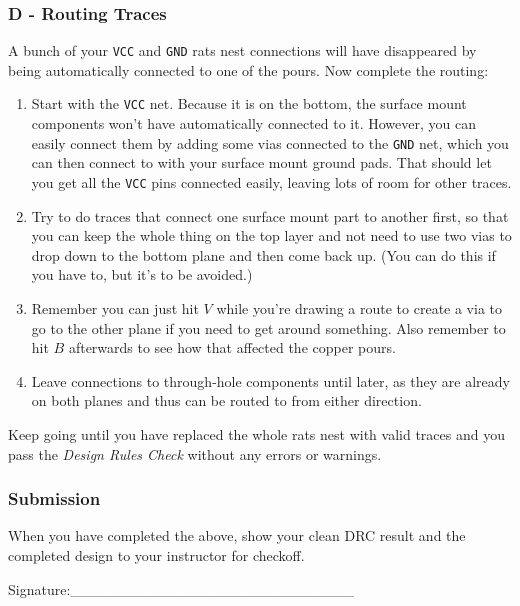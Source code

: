 \documentclass[
  letterpaper,
  DIV=11,
  numbers=noendperiod,
  oneside]{scrartcl}
\providecommand{\tightlist}{%
  \setlength{\itemsep}{0pt}\setlength{\parskip}{0pt}}\usepackage{longtable,booktabs,array}
\begin{document}
\subsubsection{D - Routing Traces}\label{d---routing-traces}

A bunch of your \texttt{VCC} and \texttt{GND} rats nest connections will
have disappeared by being automatically connected to one of the pours.
Now complete the routing:

\begin{enumerate}
\def\labelenumi{\arabic{enumi}.}
\tightlist
\item
  Start with the \texttt{VCC} net. Because it is on the bottom, the
  surface mount components won't have automatically connected to it.
  However, you can easily connect them by adding some vias connected to
  the \texttt{GND} net, which you can then connect to with your surface
  mount ground pads. That should let you get all the \texttt{VCC} pins
  connected easily, leaving lots of room for other traces.
\item
  Try to do traces that connect one surface mount part to another first,
  so that you can keep the whole thing on the top layer and not need to
  use two vias to drop down to the bottom plane and then come back up.
  (You can do this if you have to, but it's to be avoided.)
\item
  Remember you can just hit \(V\) while you're drawing a route to create
  a via to go to the other plane if you need to get around something.
  Also remember to hit \(B\) afterwards to see how that affected the
  copper pours.
\item
  Leave connections to through-hole components until later, as they are
  already on both planes and thus can be routed to from either
  direction.
\end{enumerate}

Keep going until you have replaced the whole rats nest with valid traces
and you pass the \emph{Design Rules Check} without any errors or
warnings.

\subsubsection{Submission}\label{submission-2}

When you have completed the above, show your clean DRC result and the
completed design to your instructor for checkoff.

\vspace{4em}

Signature:\_\_\_\_\_\_\_\_\_\_\_\_\_\_\_\_\_\_\_\_\_\_\_\_\_\_\_
\end{document}
